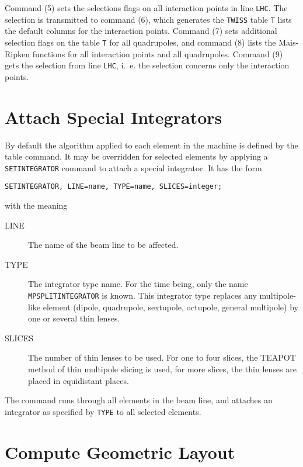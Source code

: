 Command (5) sets the selections flags on all interaction points in
line \texttt{LHC}.
The selection is transmitted to command (6), which generates the
\texttt{TWISS} table \texttt{T} lists the default columns for the
interaction points. 
Command (7) sets additional selection flags on the table \texttt{T}
for all quadrupoles,
and command (8) lists the Mais-Ripken functions for all interaction
points and all quadrupoles.
Command (9) gets the selection from line \texttt{LHC}, i.~e. the
selection concerns only the interaction points.

\section{Attach Special Integrators}
\label{sec:setint}

By default the algorithm applied to each element in the machine is
defined by the table command.
It may be overridden for selected elements by applying a \texttt{SETINTEGRATOR}
command to attach a special integrator.
It has the form
\begin{verbatim}
SETINTEGRATOR, LINE=name, TYPE=name, SLICES=integer;
\end{verbatim}
with the meaning
\begin{description}
\item[LINE]
  The name of the beam line to be affected.
\item[TYPE]
  The integrator type name.
  For the time being, only the name \\
  \texttt{MPSPLITINTEGRATOR} is known.
  This integrator type replaces any multipole-like element (dipole,
  quadrupole, sextupole, octupole, general multipole) by one or
  several thin lenses.
\item[SLICES]
  The number of thin lenses to be used.
  For one to four slices, the TEAPOT method of thin multipole slicing
  is used, for more slices, the thin lenses are placed in equidistant
  places. 
\end{description}
The command runs through all elements in the beam line,
and attaches an integrator as specified by \texttt{TYPE} to all
selected elements.


\section{Compute Geometric Layout}
\label{sec:survey}

